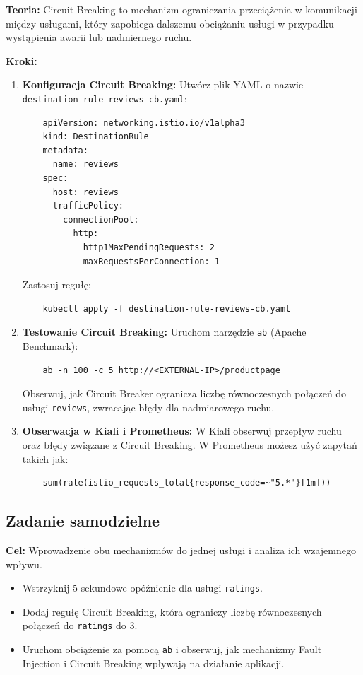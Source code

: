 \documentclass{article}
\begin{document}
\textbf{Teoria:}  
Circuit Breaking to mechanizm ograniczania przeciążenia w komunikacji między usługami, który zapobiega dalszemu obciążaniu usługi w przypadku wystąpienia awarii lub nadmiernego ruchu.

\textbf{Kroki:}
\begin{enumerate}
    \item \textbf{Konfiguracja Circuit Breaking:}  
    Utwórz plik YAML o nazwie \texttt{destination-rule-reviews-cb.yaml}:
    \begin{lstlisting}
    apiVersion: networking.istio.io/v1alpha3
    kind: DestinationRule
    metadata:
      name: reviews
    spec:
      host: reviews
      trafficPolicy:
        connectionPool:
          http:
            http1MaxPendingRequests: 2
            maxRequestsPerConnection: 1
    \end{lstlisting}
    Zastosuj regułę:
    \begin{lstlisting}
    kubectl apply -f destination-rule-reviews-cb.yaml
    \end{lstlisting}

    \item \textbf{Testowanie Circuit Breaking:}  
    Uruchom narzędzie \texttt{ab} (Apache Benchmark):
    \begin{lstlisting}
    ab -n 100 -c 5 http://<EXTERNAL-IP>/productpage
    \end{lstlisting}
    Obserwuj, jak Circuit Breaker ogranicza liczbę równoczesnych połączeń do usługi \texttt{reviews}, zwracając błędy dla nadmiarowego ruchu.

    \item \textbf{Obserwacja w Kiali i Prometheus:}  
    W Kiali obserwuj przepływ ruchu oraz błędy związane z Circuit Breaking. W Prometheus możesz użyć zapytań takich jak:
    \begin{lstlisting}
    sum(rate(istio_requests_total{response_code=~"5.*"}[1m]))
    \end{lstlisting}
\end{enumerate}

\subsection{Zadanie samodzielne}

\textbf{Cel:} Wprowadzenie obu mechanizmów do jednej usługi i analiza ich wzajemnego wpływu.

\begin{itemize}
    \item Wstrzyknij 5-sekundowe opóźnienie dla usługi \texttt{ratings}.
    \item Dodaj regułę Circuit Breaking, która ograniczy liczbę równoczesnych połączeń do \texttt{ratings} do 3.
    \item Uruchom obciążenie za pomocą \texttt{ab} i obserwuj, jak mechanizmy Fault Injection i Circuit Breaking wpływają na działanie aplikacji.
\end{itemize}
\end{document}
